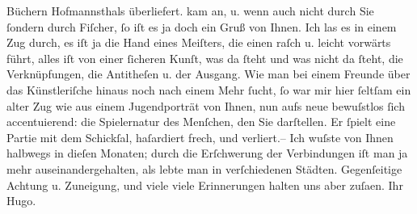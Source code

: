 \begin{ledgroupsized}[t]{13cm}
{{{                  Büchern Hofmannsthals überliefert.}}}\label{K_L02297-1h}
               kam an, u. wenn auch nicht durch Sie ſondern durch Fiſcher, ſo iſt es ja doch ein Gruß von Ihnen. Ich las es in einem Zug
               durch, es iſt ja die Hand eines Meiſters, die einen raſch u. leicht vorwärts führt,
               alles iſt von einer ſicheren Kunſt, was da ſteht und was nicht da ſteht, die
               Verknüpfungen, die Antitheſen u. der Ausgang. Wie man bei einem Freunde über das
               Künstleriſche hinaus noch nach {\pb}einem Mehr ſucht, ſo war mir hier ſeltſam ein alter Zug wie aus einem Jugendporträt
               von Ihnen, nun aufs neue bewuſstlos ſich accentuierend: die Spielernatur des
               Menſchen, den Sie darſtellen. Er ſpielt eine Partie mit dem Schickſal, haſardiert
               frech, und verliert.\hspace*{1.5em}– Ich wuſste von Ihnen halbwegs
               in dieſen Monaten; durch die Erſchwerung der Verbindungen iſt man ja mehr
               auseinandergehalten, als lebte man in verſchiedenen Städten. Gegenſeitige Achtung u.
               Zuneigung, und viele viele Erinnerungen halten uns aber zuſa{\geminationm}en.\pend
           \pstart Ihr \spacefill\mbox{Hugo.}\pend{}
         
         \endnumbering{}\end{ledgroupsized}  \newcommand{\dateiname}{L02297}\newcommand{\titel}{Hugo von Hofmannsthal an Arthur Schnitzler, 17. 8. [1918]}\newcommand{\editorInnen}{Martin Anton Müller und Gerd-Hermann Susen}
      